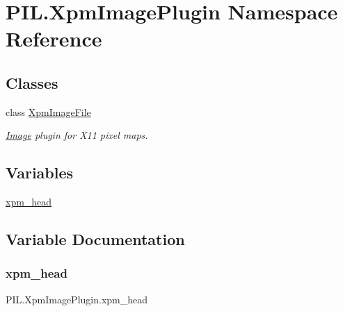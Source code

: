 \hypertarget{namespacePIL_1_1XpmImagePlugin}{}\section{P\+I\+L.\+Xpm\+Image\+Plugin Namespace Reference}
\label{namespacePIL_1_1XpmImagePlugin}
\subsection*{Classes}
\begin{DoxyCompactItemize}
\item 
class \hyperlink{classPIL_1_1XpmImagePlugin_1_1XpmImageFile}{Xpm\+Image\+File}
\begin{DoxyCompactList}\small\item\em \hyperlink{namespacePIL_1_1Image}{Image} plugin for X11 pixel maps. \end{DoxyCompactList}\end{DoxyCompactItemize}
\subsection*{Variables}
\begin{DoxyCompactItemize}
\item 
\hyperlink{namespacePIL_1_1XpmImagePlugin_af065c2f0340eecb873b753137c8e1a34}{xpm\+\_\+head}
\end{DoxyCompactItemize}


\subsection{Variable Documentation}
\mbox{\label{namespacePIL_1_1XpmImagePlugin_af065c2f0340eecb873b753137c8e1a34}} 
\subsubsection{\texorpdfstring{xpm\+\_\+head}{xpm\_head}}
{\footnotesize\ttfamily P\+I\+L.\+Xpm\+Image\+Plugin.\+xpm\+\_\+head}

